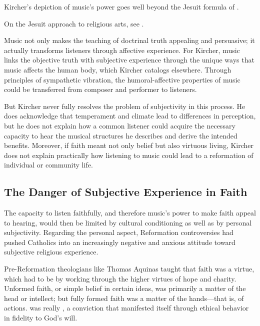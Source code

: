 Kircher's depiction of music's power goes well beyond the Jesuit formula of .%
\begin{Footnote}
  On the Jesuit approach to religious arts, see \autocite[\XXX]{Bailey:Art}.
\end{Footnote}
Music not only makes the teaching of doctrinal truth appealing and persuasive; it actually transforms listeners through affective experience.
For Kircher, music links the objective truth with subjective experience through the unique ways that music affects the human body, which Kircher catalogs elsewhere.%
\Autocite[\XXX on affects, passions]{Kircher:Musurgia}
Through principles of sympathetic vibration, the humoral-affective properties of music could be transferred from composer and performer to listeners.

But Kircher never fully resolves the problem of subjectivity in this process. 
He does acknowledge that temperament and climate lead to differences in perception,%
\Autocite[\XXX musical temperaments]{Kircher:Musurgia}
but he does not explain how a common listener could acquire the necessary capacity to hear the musical structures he describes and derive the intended benefits.
Moreover, if faith meant not only belief but also virtuous living, Kircher does not explain practically how listening to music could lead to a reformation of individual or community life.

\subsection{The Danger of Subjective Experience in Faith}

The capacity to listen faithfully, and therefore music's power to make faith appeal to hearing, would then be limited by cultural conditioning as well as by personal subjectivity.
Regarding the personal aspect, Reformation controversies had pushed Catholics into an increasingly negative and anxious attitude toward subjective religious experience.

Pre-Reformation theologians like Thomas Aquinas taught that faith was a virtue, which had to be  by working through the higher virtues of hope and charity.%
\Autocite[130--132]{Schreiner:Certainty}
Unformed faith, or simple belief in certain ideas, was primarily a matter of the head or intellect; but fully formed faith was a matter of the hands---that is, of actions.
 was really , a conviction that manifested itself through ethical behavior in fidelity to God's will.%
\Autocite[, 15--20]{Catholic:Catechismus1614}

